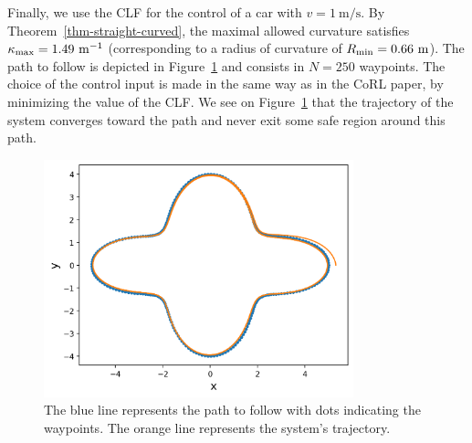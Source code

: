 \documentclass{article}
\theoremstyle{plain}
\theoremstyle{definition}
\theoremstyle{remark}
\begin{document}
Finally, we use the CLF for the control of a car with
$v=1~\mathrm{m}/\mathrm{s}$.
By Theorem~\ref{thm-straight-curved}, the maximal allowed curvature satisfies
$\kappa_{\mathrm{max}}=1.49~\mathrm{m}^{-1}$ (corresponding to a radius of curvature of $R_{\mathrm{min}}=0.66~\mathrm{m}$).
The path to follow is depicted in Figure~\ref{fig-path-following}
and consists in $N=250$ waypoints.
The choice of the control input is made in the same way as in the CoRL paper,
by minimizing the value of the CLF.
We see on Figure~\ref{fig-path-following} that the trajectory of the system
converges toward the path and never exit some safe region around this path.

\begin{figure}[h]
\centering
\includegraphics[width=0.8\textwidth]{figures/simupath}
\caption{The blue line represents the path to follow with
dots indicating the waypoints.
The orange line represents the system's trajectory.}
\label{fig-path-following}
\end{figure}
\end{document}
